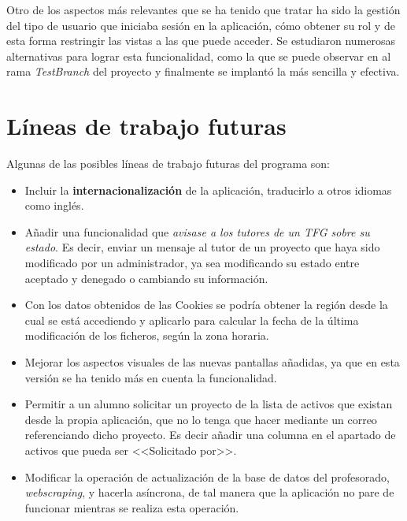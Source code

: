Otro de los aspectos más relevantes que se ha tenido que tratar ha sido la gestión del tipo de usuario que iniciaba sesión en la aplicación, cómo obtener su rol y de esta forma restringir las vistas a las que puede acceder. Se estudiaron numerosas alternativas para lograr esta funcionalidad, como la que se puede observar en al rama \emph{TestBranch} del proyecto y finalmente se implantó la más sencilla y efectiva.

\section{Líneas de trabajo futuras}

Algunas de las posibles líneas de trabajo futuras del programa son:

\begin{itemize}
	\item Incluir la \textbf{internacionalización} de la aplicación, traducirlo a otros idiomas como inglés.
	\item Añadir una funcionalidad que \emph{avisase a los tutores de un TFG sobre su estado}. Es decir, enviar un mensaje al tutor de un proyecto que haya sido modificado por un administrador, ya sea modificando su estado entre aceptado y denegado o cambiando su información.
	\item Con los datos obtenidos de las Cookies se podría obtener la región
	desde la cual se está accediendo y aplicarlo para calcular la fecha de
	la última modificación de los ficheros, según la zona horaria.
	\item Mejorar los aspectos visuales de las nuevas pantallas añadidas, ya que en esta versión se ha tenido más en cuenta la funcionalidad.
	\item Permitir a un alumno solicitar un proyecto de la lista de activos que existan desde la propia aplicación, que no lo tenga que hacer mediante un correo referenciando dicho proyecto. Es decir añadir una columna en el apartado de activos que pueda ser <<Solicitado por>>.
	\item Modificar la operación de actualización de la base de datos del profesorado, \emph{webscraping}, y hacerla asíncrona, de tal manera que la aplicación no pare de funcionar mientras se realiza esta operación.
	
\end{itemize}